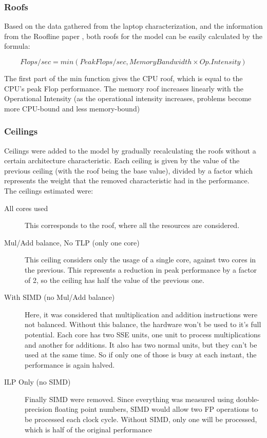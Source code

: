 \subsubsection{Roofs}

Based on the data gathered from the laptop characterization, and the information from the Roofline paper \cite{roofline}, both roofs for the model can be easily calculated by the formula:

$$ Flops/sec = min(Peak Flops/sec, Memory Bandwidth \times Op. Intensity ) $$

The first part of the $\mathrm{min}$ function gives the CPU roof, which is equal to the CPU's peak Flop performance. The memory roof increases linearly with the Operational Intensity (as the operational intensity increases, problems become more CPU-bound and less memory-bound)

\subsubsection{Ceilings}

Ceilings were added to the model by gradually recalculating the roofs without a certain architecture characteristic. Each ceiling is given by the value of the previous ceiling (with the roof being the base value), divided by a factor which represents the weight that the removed characteristic had in the performance. The ceilings estimated were:
\begin{description}
	\item[All cores used]This corresponds to the roof, where all the resources are considered.
	\item[Mul/Add balance, No TLP (only one core)]This ceiling considers only the usage of a single core, against two cores in the previous. This represents a reduction in peak performance by a factor of 2, so the ceiling has half the value of the previous one.
	\item[With SIMD (no Mul/Add balance)]Here, it was considered that multiplication and addition instructions were not balanced. Without this balance, the hardware won't be used to it's full potential. Each core has two SSE units, one unit to process multiplications and another for additions. It also has two normal units, but they can't be used at the same time. So if only one of those is busy at each instant, the performance is again halved.
	\item[ILP Only (no SIMD)]Finally SIMD were removed. Since everything was measured using double-precision floating point numbers, SIMD would allow two FP operations to be processed each clock cycle. Without SIMD, only one will be processed, which is half of the original performance
\end{description}

